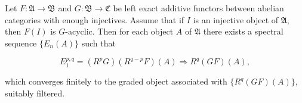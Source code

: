 Let $F: \mathfrak{A} \to \mathfrak{B}$ and $G: \mathfrak{B} \to \mathfrak{C}$ be left exact additive functors between abelian categories with enough injectives. Assume that if $I$ is an injective object of $\mathfrak{A}$, then $F(I)$ is $G$-acyclic. Then for each object $A$ of $\mathfrak{A}$ there exists a spectral sequence $\{E_n(A)\}$ such that

$$
E_1^{p,q} = (R^p G)(R^{q-p} F)(A) \Rightarrow R^q(GF)(A),
$$

which converges finitely to the graded object associated with $\{R^q(GF)(A)\}$, suitably filtered.
